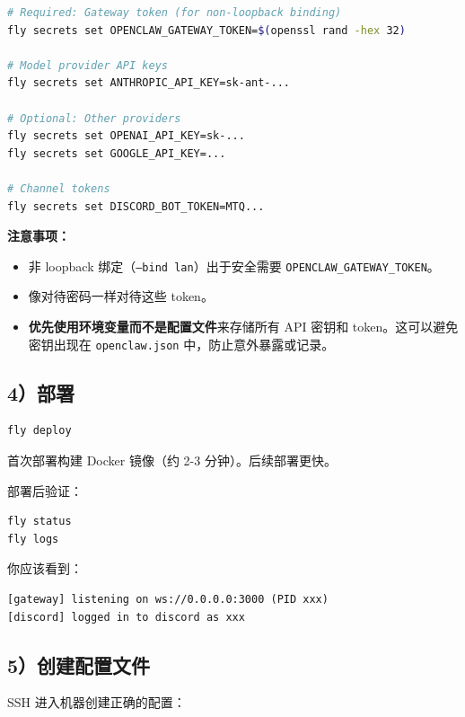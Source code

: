 \begin{lstlisting}[language=bash]
# Required: Gateway token (for non-loopback binding)
fly secrets set OPENCLAW_GATEWAY_TOKEN=$(openssl rand -hex 32)

# Model provider API keys
fly secrets set ANTHROPIC_API_KEY=sk-ant-...

# Optional: Other providers
fly secrets set OPENAI_API_KEY=sk-...
fly secrets set GOOGLE_API_KEY=...

# Channel tokens
fly secrets set DISCORD_BOT_TOKEN=MTQ...
\end{lstlisting}


\textbf{注意事项：}

\begin{itemize}
  \item 非 loopback 绑定（\texttt{--bind lan}）出于安全需要 \texttt{OPENCLAW\_GATEWAY\_TOKEN}。
  \item 像对待密码一样对待这些 token。
  \item \textbf{优先使用环境变量而不是配置文件}来存储所有 API 密钥和 token。这可以避免密钥出现在 \texttt{openclaw.json} 中，防止意外暴露或记录。
\end{itemize}


\subsection{4）部署}


\begin{lstlisting}[language=bash]
fly deploy
\end{lstlisting}


首次部署构建 Docker 镜像（约 2-3 分钟）。后续部署更快。

部署后验证：

\begin{lstlisting}[language=bash]
fly status
fly logs
\end{lstlisting}


你应该看到：

\begin{lstlisting}
[gateway] listening on ws://0.0.0.0:3000 (PID xxx)
[discord] logged in to discord as xxx
\end{lstlisting}


\subsection{5）创建配置文件}


SSH 进入机器创建正确的配置：


